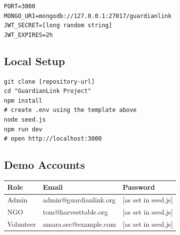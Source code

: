 \documentclass[11pt,letterpaper]{article}
\begin{document}
\begin{Verbatim}[fontsize=\small,xleftmargin=1.5em]
PORT=3000
MONGO_URI=mongodb://127.0.0.1:27017/guardianlink
JWT_SECRET=[long random string]
JWT_EXPIRES=2h
\end{Verbatim}

\subsection{Local Setup}

\begin{Verbatim}[fontsize=\small,xleftmargin=1.5em]
git clone [repository-url]
cd "GuardianLink Project"
npm install
# create .env using the template above
node seed.js
npm run dev
# open http://localhost:3000
\end{Verbatim}

\subsection{Demo Accounts}

\begin{center}
\begin{tabular}{@{}lll@{}}
\toprule
\textbf{Role} & \textbf{Email} & \textbf{Password}\\
\midrule
Admin     & admin@guardianlink.org  & [as set in seed.js]\\
NGO       & tom@harvesttable.org    & [as set in seed.js]\\
Volunteer & amara.sec@example.com   & [as set in seed.js]\\
\bottomrule
\end{tabular}
\end{center}
\end{document}
